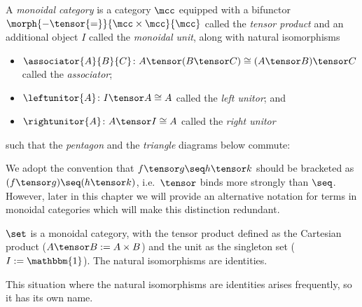 \begin{definition}
    \label{def:monoidal-category}
    A \emph{monoidal category} is a category \(\mcc\) equipped with a
    bifunctor \(\morph{{-} \tensor {=}}{\mcc \times \mcc}{\mcc}\) called the
    \emph{tensor product} and an additional object \(I\) called the
    \emph{monoidal unit},
    along with natural isomorphisms
    \begin{itemize}
        \item \(
            \associator{A}{B}{C}
            \colon
            A \tensor (B \tensor C)
            \cong
            (A \tensor B) \tensor C
            \) called the \emph{associator};
        \item \(
            \leftunitor{A}
            \colon
            I \tensor A
            \cong
            A
            \) called the \emph{left unitor}; and
        \item \(
            \rightunitor{A}
            \colon
            A \tensor I
            \cong
            A
            \) called the \emph{right unitor}
    \end{itemize}
    such that the \emph{pentagon} and the \emph{triangle} diagrams below
    commute:
    \begin{center}
        

        \vspace{1em}

        
    \end{center}
\end{definition}

We adopt the convention that \(f \tensor g \seq h \tensor k\) should be
bracketed as \((f \tensor g) \seq (h \tensor k)\), i.e.\ \(\tensor\) binds
more strongly than \(\seq\).
However, later in this chapter we will provide an alternative notation for terms
in monoidal categories which will make this distinction redundant.

\begin{example}
    \(\set\) is a monoidal category, with the tensor product defined as the
    Cartesian product (\(A \tensor B := A \times B\)) and the unit as the
    singleton set (\(I := \mathbbm{1}\)).
    The natural isomorphisms are identities.
\end{example}

This situation where the natural isomorphisms are identities arises frequently,
so it has its own name.

